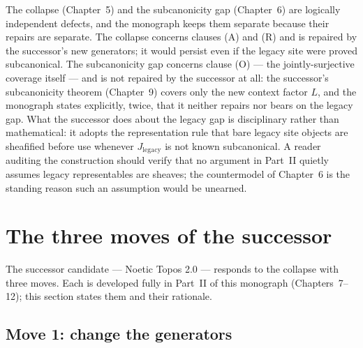 The collapse (Chapter~5) and the subcanonicity gap (Chapter~6) are
logically independent defects, and the monograph keeps them separate
because their repairs are separate. The collapse concerns clauses (A) and
(R) and is repaired by the successor's new generators; it would persist
even if the legacy site were proved subcanonical. The subcanonicity gap
concerns clause (O) --- the jointly-surjective coverage itself --- and is
not repaired by the successor at all: the successor's subcanonicity
theorem (Chapter~9) covers only the new context factor $L$, and the
monograph states explicitly, twice, that it neither repairs nor bears on
the legacy gap. What the successor does about the legacy gap is
disciplinary rather than mathematical: it adopts the representation rule
that bare legacy site objects are sheafified before use whenever
$J_{\mathrm{legacy}}$ is not known subcanonical. A reader auditing the
construction should verify that no argument in Part~II quietly assumes
legacy representables are sheaves; the countermodel of Chapter~6 is the
standing reason such an assumption would be unearned.

\section{The three moves of the successor}\label{ch01:sec:threemoves}

The successor candidate --- Noetic Topos 2.0 --- responds to the collapse
with three moves. Each is developed fully in Part~II of this monograph
(Chapters~7--12); this section states them and their rationale.

\subsection{Move 1: change the generators}\label{ch01:sec:move1}

